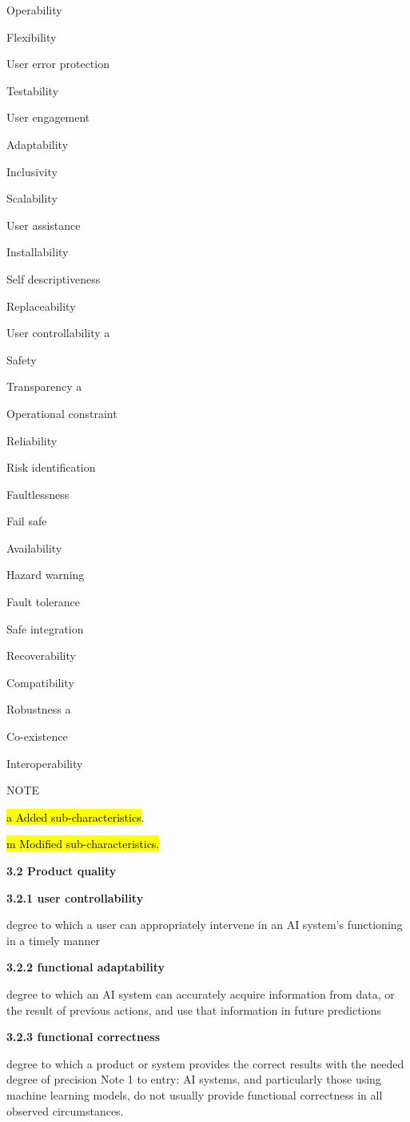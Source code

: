 \documentclass[
  letterpaper,
  DIV=11,
  numbers=noendperiod,
  oneside]{scrreprt}
\begin{document}
\begin{tcolorbox}
Operability

Flexibility

User error protection

Testability

User engagement

Adaptability

Inclusivity

Scalability

User assistance

Installability

Self descriptiveness

Replaceability

User controllability a

Safety

Transparency a

Operational constraint

Reliability

Risk identification

Faultlessness

Fail safe

Availability

Hazard warning

Fault tolerance

Safe integration

Recoverability

Compatibility

Robustness a

Co-existence

Interoperability

NOTE

\hl{a Added sub-characteristics}.

\hl{m Modified sub-characteristics.}

\textbf{3.2 Product quality}

\textbf{3.2.1 user controllability}

degree to which a user can appropriately intervene in an AI system's
functioning in a timely manner

\textbf{3.2.2 functional adaptability}

degree to which an AI system can accurately acquire information from
data, or the result of previous actions, and use that information in
future predictions

\textbf{3.2.3 functional correctness}

degree to which a product or system provides the correct results with
the needed degree of precision Note 1 to entry: AI systems, and
particularly those using machine learning models, do not usually provide
functional correctness in all observed circumstances.


\end{tcolorbox}
\end{document}
